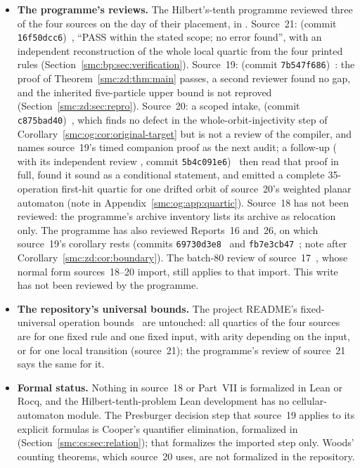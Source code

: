 \documentclass[11pt,letterpaper]{article}
\numberwithin{equation}{section}
\theoremstyle{definition}
\theoremstyle{remark}
\begin{document}
\begin{itemize}
\item \textbf{The programme's reviews.} The Hilbert's-tenth programme reviewed three of the four sources on the day of their placement, in . Source~21:  (commit \texttt{16f50dcc6})~\cite{reviewplanar}, ``PASS within the stated scope; no error found'', with an independent reconstruction of the whole local quartic from the four printed rules (Section~\ref{smc:bp:sec:verification}). Source~19:  (commit \texttt{7b547f686})~\cite{reviewzd}: the proof of Theorem~\ref{smc:zd:thm:main} passes, a second reviewer found no gap, and the inherited five-particle upper bound is not reproved (Section~\ref{smc:zd:sec:repro}). Source~20: a scoped intake,  (commit \texttt{c875bad40})~\cite{reviewfirsthit}, which finds no defect in the whole-orbit-injectivity step of Corollary~\ref{smc:og:cor:original-target} but is not a review of the compiler, and names source~19's timed companion proof as the next audit; a follow-up ( with its independent review , commit \texttt{5b4c091e6})~\cite{reviewfixture} then read that proof in full, found it sound as a conditional statement, and emitted a complete 35-operation first-hit quartic for one drifted orbit of source~20's weighted planar automaton (note in Appendix~\ref{smc:og:app:quartic}). Source~18 has not been reviewed: the programme's archive inventory  lists its archive as relocation only. The programme has also reviewed Reports~16 and~26, on which source~19's corollary rests (commits \texttt{69730d3e8}~\cite{reviewsource16} and \texttt{fb7e3cb47}~\cite{reviewparallel}; note after Corollary~\ref{smc:zd:cor:boundary}). The batch-80 review of source~17~\cite{reviewlowmass}, whose normal form sources~18--20 import, still applies to that import. This write has not been reviewed by the programme.
\item \textbf{The repository's universal bounds.} The project README's fixed-universal operation bounds~\cite{repo} are untouched: all quartics of the four sources are for one fixed rule and one fixed input, with arity depending on the input, or for one local transition (source~21); the programme's review of source~21 says the same for it.
\item \textbf{Formal status.} Nothing in source~18 or Part~VII is formalized in Lean or Rocq, and the Hilbert-tenth-problem Lean development has no cellular-automaton module. The Presburger decision step that source~19 applies to its explicit formulas is Cooper's quantifier elimination, formalized in  (Section~\ref{smc:cs:sec:relation}); that formalizes the imported step only. Woods' counting theorems, which source~20 uses, are not formalized in the repository.
\end{itemize}
\end{document}
